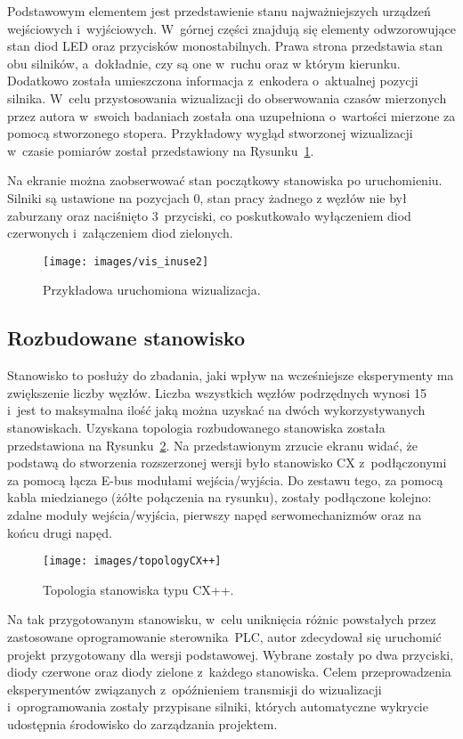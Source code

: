 Podstawowym elementem jest przedstawienie stanu najważniejszych urządzeń wejściowych i~wyjściowych. W~górnej części znajdują się elementy odwzorowujące stan diod LED oraz przycisków monostabilnych. Prawa strona przedstawia stan obu silników, a~dokładnie, czy są one w~ruchu oraz w którym kierunku. Dodatkowo została umieszczona informacja z~enkodera o~aktualnej pozycji silnika. W~celu przystosowania wizualizacji do obserwowania czasów mierzonych przez autora w~swoich badaniach została ona uzupełniona o~wartości mierzone za pomocą stworzonego stopera. 
\noindent Przykładowy wygląd stworzonej wizualizacji w~czasie pomiarów został przedstawiony na Rysunku~\ref{vis_inuse}.

\noindent Na ekranie można zaobserwować stan początkowy stanowiska po uruchomieniu. Silniki są ustawione na pozycjach 0, stan pracy żadnego z węzłów nie był zaburzany oraz naciśnięto 3~przyciski, co poskutkowało wyłączeniem diod czerwonych i~załączeniem diod zielonych.
\clearpage
\begin{figure}[!htb] 	\centering 	\texttt{[image: images/vis\_inuse2]} \caption{Przykładowa uruchomiona wizualizacja.} \label{vis_inuse} \end{figure}
\vspace{-15mm}
\subsection{Rozbudowane stanowisko}
Stanowisko to posłuży do zbadania, jaki wpływ na wcześniejsze eksperymenty ma zwiększenie liczby węzłów. Liczba wszystkich węzłów podrzędnych wynosi 15 i~jest to maksymalna ilość jaką można uzyskać na dwóch wykorzystywanych stanowiskach. Uzyskana topologia rozbudowanego stanowiska została przedstawiona na Rysunku~\ref{topology:cx++}.
Na przedstawionym zrzucie ekranu widać, że podstawą do stworzenia rozszerzonej wersji było stanowisko CX z~podłączonymi za pomocą łącza E-bus modułami wejścia/wyjścia. Do zestawu tego, za pomocą kabla miedzianego (żółte połączenia na rysunku), zostały podłączone kolejno: zdalne moduły wejścia/wyjścia, pierwszy napęd serwomechanizmów oraz na końcu drugi napęd.

\begin{figure}[!htb] 	\centering 	\texttt{[image: images/topologyCX++]} \caption{Topologia stanowiska typu CX++.} \label{topology:cx++} \end{figure}

Na tak przygotowanym stanowisku, w~celu uniknięcia różnic powstałych przez zastosowane oprogramowanie sterownika~PLC, autor zdecydował się uruchomić projekt przygotowany dla wersji podstawowej. Wybrane zostały po dwa przyciski, diody czerwone oraz diody zielone z~każdego stanowiska. Celem przeprowadzenia eksperymentów związanych z~opóźnieniem transmisji do wizualizacji i~oprogramowania zostały przypisane silniki, których automatyczne wykrycie udostępnia środowisko do zarządzania projektem.


